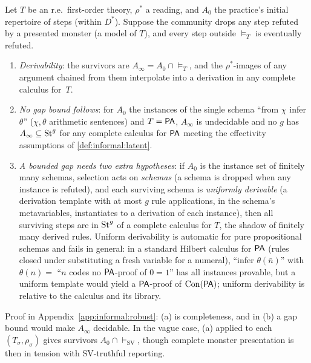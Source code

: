 \begin{proposition}\label{prop:informal:emergence}
Let $T$ be an r.e.\ first-order theory, $\rho^*$ a reading, and $A_0$ the practice's initial repertoire of steps (within $D^*$). Suppose the community drops any step refuted by a presented monster (a model of $T$), and every step outside ${\models_T}$ is eventually refuted.
\begin{enumerate}[label=(\alph*)]
\item \emph{Derivability}: the survivors are $A_\infty=A_0\cap{\models_T}$, and the $\rho^*$-images of any argument chained from them interpolate into a derivation in any complete calculus for~$T$.
\item \emph{No gap bound follows}: for $A_0$ the instances of the single schema ``from $\chi$ infer $\theta$'' ($\chi,\theta$ arithmetic sentences) and $T=\mathsf{PA}$, $A_\infty$ is undecidable and no $g$ has $A_\infty\subseteq\mathrm{St}^{g}_{}$ for any complete calculus for $\mathsf{PA}$ meeting the effectivity assumptions of \cref{def:informal:latent}.
\item \emph{A bounded gap needs two extra hypotheses}: if $A_0$ is the instance set of finitely many schemas, selection acts on \emph{schemas} (a schema is dropped when any instance is refuted), and each surviving schema is \emph{uniformly derivable} (a derivation template with at most $g$ rule applications, in the schema's metavariables, instantiates to a derivation of each instance), then all surviving steps are in $\mathrm{St}^{g}_{}$ of a complete calculus for $T$, the shadow of finitely many derived rules. Uniform derivability is automatic for pure propositional schemas and fails in general: in a standard Hilbert calculus for $\mathsf{PA}$ (rules closed under substituting a fresh variable for a numeral), ``infer $\theta(\bar n)$'' with $\theta(n)=$ ``$n$ codes no $\mathsf{PA}$-proof of $0=1$'' has all instances provable, but a uniform template would yield a $\mathsf{PA}$-proof of $\mathrm{Con}(\mathsf{PA})$; uniform derivability is relative to the calculus and its library.
\end{enumerate}
\end{proposition}

Proof in Appendix~\ref{app:informal:robust}: (a) is completeness, and in (b) a gap bound would make $A_\infty$ decidable. In the vague case, (a) applied to each $(T_\sigma,\rho_\sigma)$ gives survivors $A_0\cap{\models_{\mathrm{SV}}}$, though complete monster presentation is then in tension with SV-truthful reporting.

